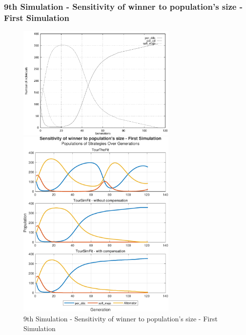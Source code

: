 \documentclass[12pt]{article}
\begin{document}
\subsubsection{9th Simulation - Sensitivity of winner to population's size - First Simulation}
	\begin{figure}[h]
	    \centering
		\includegraphics[width=0.7\textwidth]{RefPaperFigures/fig8a.jpeg}\par\vspace{0.5em}
	    \includegraphics[width=0.7\textwidth]{Sensitivity of winner to population's size - First Simulation.pdf}
	    \caption{9th Simulation - Sensitivity of winner to population's size - First Simulation}
	    \label{fig:Monotonous Convergence}
	\end{figure}
\end{document}

